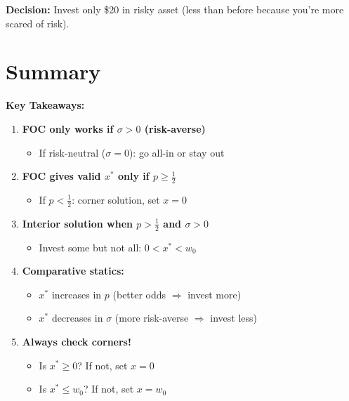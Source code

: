 \documentclass[12pt]{article}
\begin{document}
\textbf{Decision:} Invest only \$20 in risky asset (less than before because you're more scared of risk).

\section*{Summary}

\begin{tcolorbox}[colback=green!5!white,colframe=green!75!black]
\textbf{Key Takeaways:}

\begin{enumerate}[leftmargin=*]
\item \textbf{FOC only works if $\sigma > 0$ (risk-averse)}
\begin{itemize}
\item If risk-neutral ($\sigma = 0$): go all-in or stay out
\end{itemize}

\item \textbf{FOC gives valid $x^*$ only if $p \geq \frac{1}{2}$}
\begin{itemize}
\item If $p < \frac{1}{2}$: corner solution, set $x = 0$
\end{itemize}

\item \textbf{Interior solution when $p > \frac{1}{2}$ and $\sigma > 0$}
\begin{itemize}
\item Invest some but not all: $0 < x^* < w_0$
\end{itemize}

\item \textbf{Comparative statics:}
\begin{itemize}
\item $x^*$ increases in $p$ (better odds $\Rightarrow$ invest more)
\item $x^*$ decreases in $\sigma$ (more risk-averse $\Rightarrow$ invest less)
\end{itemize}

\item \textbf{Always check corners!}
\begin{itemize}
\item Is $x^* \geq 0$? If not, set $x = 0$
\item Is $x^* \leq w_0$? If not, set $x = w_0$
\end{itemize}
\end{enumerate}
\end{tcolorbox}
\end{document}
